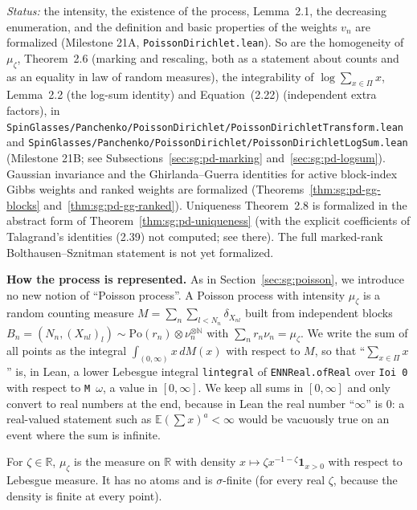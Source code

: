 \emph{Status:} the intensity, the existence of the process, Lemma~2.1, the decreasing enumeration, and the definition and basic properties of the weights $v_n$ are formalized (Milestone 21A, \texttt{PoissonDirichlet.lean}). So are the homogeneity of $\mu_\zeta$, Theorem~2.6 (marking and rescaling, both as a statement about counts and as an equality in law of random measures), the integrability of $\log\sum_{x\in\Pi}x$, Lemma~2.2 (the log-sum identity) and Equation~(2.22) (independent extra factors), in \texttt{SpinGlasses/Panchenko/PoissonDirichlet/PoissonDirichletTransform.lean} and \texttt{SpinGlasses/Panchenko/PoissonDirichlet/PoissonDirichletLogSum.lean} (Milestone 21B; see Subsections~\ref{sec:sg:pd-marking} and~\ref{sec:sg:pd-logsum}). Gaussian invariance and the Ghirlanda--Guerra identities for active block-index Gibbs weights and ranked weights are formalized (Theorems~\ref{thm:sg:pd-gg-blocks} and~\ref{thm:sg:pd-gg-ranked}). Uniqueness Theorem~2.8 is formalized in the abstract form of Theorem~\ref{thm:sg:pd-uniqueness} (with the explicit coefficients of Talagrand's identities (2.39) not computed; see there). The full marked-rank Bolthausen--Sznitman statement is not yet formalized.

\medskip\noindent\textbf{How the process is represented.} As in Section~\ref{sec:sg:poisson}, we introduce no new notion of ``Poisson process''. A Poisson process with intensity $\mu_\zeta$ is a random counting measure $M=\sum_n\sum_{l<N_n}\delta_{X_{nl}}$ built from independent blocks $B_n=(N_n,(X_{nl})_l)\sim\mathrm{Po}(r_n)\otimes\nu_n^{\otimes\mathbb N}$ with $\sum_nr_n\nu_n=\mu_\zeta$. We write the sum of all points as the integral $\int_{(0,\infty)}x\,dM(x)$ with respect to $M$, so that ``$\sum_{x\in\Pi}x$'' is, in Lean, a lower Lebesgue integral \texttt{lintegral} of \texttt{ENNReal.ofReal} over \texttt{Ioi 0} with respect to \texttt{M $\omega$}, a value in $[0,\infty]$. We keep all sums in $[0,\infty]$ and only convert to real numbers at the end, because in Lean the real number ``$\infty$'' is $0$: a real-valued statement such as $\mathbb E(\sum x)^a<\infty$ would be vacuously true on an event where the sum is infinite.

\begin{definition}\label{def:sg:pd-intensity}
  \leanok
For $\zeta\in\mathbb R$, $\mu_\zeta$ is the measure on $\mathbb R$ with density $x\mapsto\zeta x^{-1-\zeta}\mathbf 1_{x>0}$ with respect to Lebesgue measure. It has no atoms and is $\sigma$-finite (for every real $\zeta$, because the density is finite at every point).
\end{definition}

